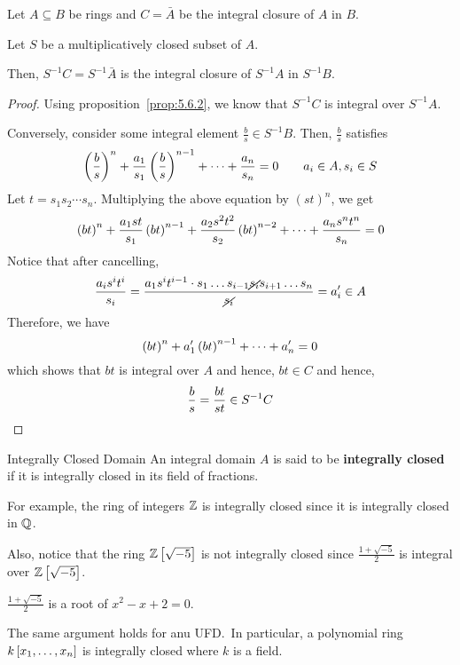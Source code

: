 \begin{proposition}{}{}
\label{prop:5.12}
	Let \(A \subseteq B\) be rings and
	\(C = \bar{A}\) be the integral closure of \(A\) in \(B\).

	Let \(S\) be a multiplicatively closed subset of \(A\).

	Then, \(S^{-1} C = S^{-1} \bar{A}\) is the integral closure of
	\(S^{-1} A\) in \(S^{-1} B\).
\end{proposition}
\begin{proof}
	Using proposition~\ref{prop:5.6.2}, we know that \(S^{-1} C\) is
	integral over \(S^{-1} A\).

	Conversely, consider some integral element \(\frac{b}{s} \in S^{-1} B\).
	Then, \(\frac{b}{s}\) satisfies
	\[
		\left( \frac{b}{s} \right)^n + \frac{a_1}{s_1} \left( \frac{b}{s} \right)^{n-1}
		+ \cdots + \frac{a_n}{s_n} = 0 \quad\quad a_i \in A, s_i \in S
	\]
	Let \(t = s_1 s_2 \cdots s_n\).
	Multiplying the above equation by \((st)^n\), we get
	\[
		\left( bt \right)^n + \frac{a_1 st}{s_1} \left( bt \right)^{n-1}
		+ \frac{a_2 s^2 t^2}{s_2} \left( bt \right)^{n-2}
		+ \cdots + \frac{a_n s^n t^n}{s_n} = 0
	\]
	Notice that after cancelling,
	\[
		\frac{a_i s^i t^i}{s_i} = \frac{a_1 s^i t^{i-1} \cdot
		s_1 \ldots s_{i-1} \cancel{s_i} s_{i+1} \ldots s_n}{\cancel{s_i}}
		= a_i' \in A
	\]
	Therefore, we have
	\[
		\left( bt \right)^n + a_1' \left( bt \right)^{n-1} + \cdots + a_n' = 0
	\]
	which shows that \(bt\) is integral over \(A\) and hence, \(bt \in C\)
	and hence,
	\[
		\frac{b}{s} = \frac{bt}{st} \in S^{-1} C \qedhere
	\]
\end{proof}

\begin{defn}{Integrally Closed Domain}{}
	An integral domain \(A\) is said to be \textbf{integrally closed} if
	it is integrally closed in its field of fractions.
\end{defn}

For example, the ring of integers \(\ZZ\) is integrally closed since it is
integrally closed in \(\QQ\).

Also, notice that the ring \(\ZZ\sbrak{\sqrt{-5}}\) is not integrally closed
since \(\frac{1 + \sqrt{-5}}{2}\) is integral over \(\ZZ\sbrak{\sqrt{-5}}\).

\(\frac{1 + \sqrt{-5}}{2}\) is a root of \(x^2 - x + 2 = 0\).

The same argument holds for anu UFD.\
In particular, a polynomial ring \(k\left[ x_1, \ldots, x_n \right]\) is integrally
closed where \(k\) is a field.

